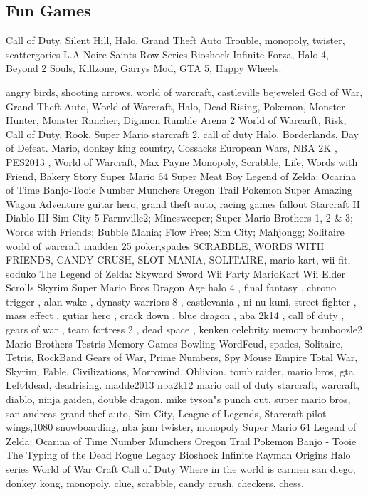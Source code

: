 \subsection{Fun Games}
Call of Duty, Silent Hill, Halo, Grand Theft Auto
Trouble, monopoly, twister, scattergories
L.A Noire  Saints Row Series  Bioshock Infinite
Forza, Halo 4, Beyond 2 Souls, Killzone, Garrys Mod, GTA 5, Happy Wheels.

angry birds, shooting arrows, world of warcraft, castleville bejeweled  
God of War, Grand Theft Auto, World of Warcraft, Halo, Dead Rising, Pokemon, Monster Hunter, Monster Rancher, Digimon Rumble Arena 2
World of Warcarft, Risk, Call of Duty, Rook, Super Mario
starcraft 2, call of duty
Halo, Borderlands, Day of Defeat.
Mario, donkey king country, 
Cossacks European Wars, NBA 2K , PES2013 , World of Warcraft, Max Payne
Monopoly, Scrabble, Life, Words with Friend, Bakery Story
Super Mario 64  Super Meat Boy  Legend of Zelda: Ocarina of Time  Banjo-Tooie  Number Munchers  Oregon Trail  Pokemon  Super Amazing Wagon Adventure
guitar hero, grand theft auto, racing games
fallout
Starcraft II  Diablo III  Sim City 5
Farmville2; Minesweeper; Super Mario Brothers 1, 2 & 3; Words with Friends; Bubble Mania; Flow Free; Sim City; Mahjongg; Solitaire
world of warcraft
madden 25
poker,spades
SCRABBLE, WORDS WITH FRIENDS, CANDY CRUSH, SLOT MANIA, SOLITAIRE, 
mario kart, wii fit, soduko
The Legend of Zelda: Skyward Sword  Wii Party  MarioKart Wii
Elder Scrolls Skyrim  Super Mario Bros  Dragon Age
halo 4 , final fantasy , chrono trigger , alan wake , dynasty warriors 8 , castlevania , ni nu kuni, street fighter , mass effect , gutiar hero , crack down , blue dragon , nba 2k14 , call of duty , gears of war , team fortress 2 , dead space ,
kenken celebrity memory bamboozle2
Mario Brothers  Testris  Memory Games  Bowling
WordFeud, spades, Solitaire, Tetris, RockBand
Gears of War, Prime Numbers, Spy Mouse
Empire Total War, Skyrim, Fable, Civilizations, Morrowind, Oblivion.
tomb raider, mario bros, gta
Left4dead, deadrising. 
madde2013  nba2k12  mario
call of duty
starcraft, warcraft, diablo, ninja gaiden, double dragon, mike tyson"s punch out, super mario bros, san andreas grand thef auto, 
Sim City, League of Legends, Starcraft
pilot wings,1080 snowboarding, nba jam
twister, monopoly
Super Mario 64  Legend of Zelda: Ocarina of Time  Number Munchers  Oregon Trail  Pokemon   Banjo - Tooie
The Typing of the Dead  Rogue Legacy  Bioshock Infinite  Rayman Origins
Halo series  World of War Craft  Call of Duty
Where in the world is carmen san diego, donkey kong, monopoly, clue, scrabble, candy crush, checkers, chess, 
